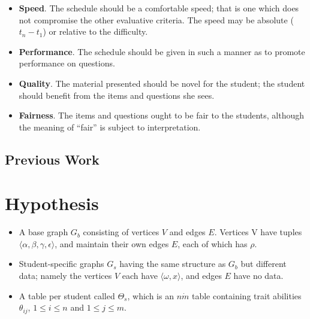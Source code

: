 \documentclass{article}
\begin{document}
 \begin{itemize}

   \item \textbf{Speed}. The schedule should be a comfortable speed; that is
   one which does not compromise the other evaluative criteria. The speed may
   be absolute ($t_n - t_1$) or relative to the difficulty. 

   \item \textbf{Performance}. The schedule should be given in such a manner
   as to promote performance on questions.  

   \item \textbf{Quality}. The material presented should be novel for the
   student; the student should benefit from the items and questions she sees.

   \item \textbf{Fairness}. The items and questions ought to be fair to the
   students, although the meaning of ``fair'' is subject to interpretation.

 \end{itemize} 

\subsection{Previous Work}


\section{Hypothesis}

\begin{itemize}

  \item A base graph $G_{b}$ consisting of vertices $V$ and edges $E$.
  Vertices V have tuples $\langle\alpha, \beta, \gamma, \epsilon\rangle$, and
  maintain their own edges $E$, each of which has $\rho$.  

  \item Student-specific graphs $G_{s}$ having the same structure as $G_{b}$
  but different data; namely the vertices $V$ each have $\langle\omega,
  x\rangle$, and edges $E$ have no data.

  \item A table per student called $\Theta_s$, which is an $n \dot m$ table
  containing trait abilities $\theta_{ij}$, $1 \leq i \leq n$ and $1 \leq j
  \leq m$.

\end{itemize}
\end{document}

